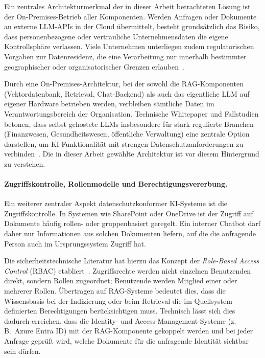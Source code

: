 Ein zentrales Architekturmerkmal der in dieser Arbeit betrachteten Lösung ist der On-Premises-Betrieb aller Komponenten.
Werden Anfragen oder Dokumente an externe LLM-APIs in der Cloud übermittelt, besteht grundsätzlich das Risiko, dass personenbezogene oder vertrauliche Unternehmensdaten die eigene Kontrollsphäre verlassen.
Viele Unternehmen unterliegen zudem regulatorischen Vorgaben zur Datenresidenz, die eine Verarbeitung nur innerhalb bestimmter geographischer oder organisatorischer Grenzen erlauben~\cite{gdpr2016}.

Durch eine On-Premises-Architektur, bei der sowohl die RAG-Komponenten (Vektordatenbank, Retrieval, Chat-Backend) als auch das eigentliche LLM auf eigener Hardware betrieben werden, verbleiben sämtliche Daten im Verantwortungsbereich der Organisation.
Technische Whitepaper und Fallstudien betonen, dass selbst gehostete LLMs insbesondere für stark regulierte Branchen (Finanzwesen, Gesundheitswesen, öffentliche Verwaltung) eine zentrale Option darstellen, um KI-Funktionalität mit strengen Datenschutzanforderungen zu verbinden~\cite{omnifact2024selfhosted}.
Die in dieser Arbeit gewählte Architektur ist vor diesem Hintergrund zu verstehen.

\paragraph{Zugriffskontrolle, Rollenmodelle und Berechtigungsvererbung.}

Ein weiterer zentraler Aspekt datenschutzkonformer KI-Systeme ist die Zugriffskontrolle.
In Systemen wie SharePoint oder OneDrive ist der Zugriff auf Dokumente häufig rollen- oder gruppenbasiert geregelt.
Ein interner Chatbot darf daher nur Informationen aus solchen Dokumenten liefern, auf die die anfragende Person auch im Ursprungssystem Zugriff hat.

Die sicherheitstechnische Literatur hat hierzu das Konzept der \textit{Role-Based Access Control} (RBAC) etabliert~\cite{sandhu1996rbac}.
Zugriffsrechte werden nicht einzelnen Benutzenden direkt, sondern Rollen zugeordnet; Benutzende werden Mitglied einer oder mehrerer Rollen.
Übertragen auf RAG-Systeme bedeutet dies, dass die Wissensbasis bei der Indizierung oder beim Retrieval die im Quellsystem definierten Berechtigungen berücksichtigen muss.
Technisch lässt sich dies dadurch erreichen, dass die Identity- und Access-Management-Systeme (z.\,B.\ Azure Entra ID) mit der RAG-Komponente gekoppelt werden und bei jeder Anfrage geprüft wird, welche Dokumente für die anfragende Identität sichtbar sein dürfen.

